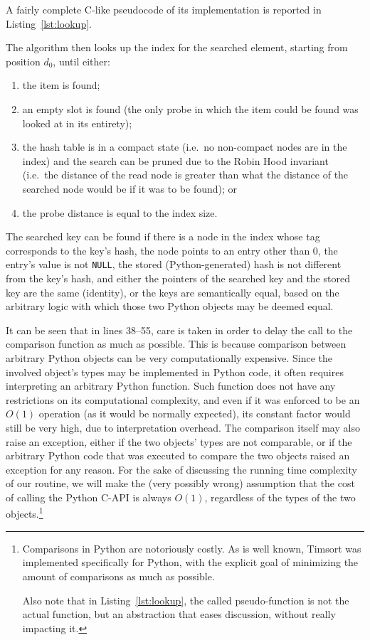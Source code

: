 A fairly complete C-like pseudocode of its implementation is reported in Listing~\ref{lst:lookup}.

The algorithm then looks up the index for the searched element, starting from position $d_0$, until either:
\begin{enumerate}
	\item the item is found;
	\item an empty slot is found (the only probe in which the item could be found was looked at in its entirety);
	\item the hash table is in a compact state (i.e.\ no non-compact nodes are in the index) and the search can be pruned due to the Robin Hood invariant (i.e.\ the distance of the read node is greater than what the distance of the searched node would be if it was to be found); or
	\item the probe distance is equal to the index size.
\end{enumerate}

The searched key can be found if there is a node in the index whose tag corresponds to the key's hash, the node points to an entry other than 0, the entry's value is not \texttt{NULL}, the stored (Python-generated) hash is not different from the key's hash, and either the pointers of the searched key and the stored key are the same (identity), or the keys are semantically equal, based on the arbitrary logic with which those two Python objects may be deemed equal.

It can be seen that in lines 38--55, care is taken in order to delay the call to the comparison function as much as possible.
This is because comparison between arbitrary Python objects can be very computationally expensive.
Since the involved object's types may be implemented in Python code, it often requires interpreting an arbitrary Python function.
Such function does not have any restrictions on its computational complexity, and even if it was enforced to be an $O(1)$ operation (as it would be normally expected), its constant factor would still be very high, due to interpretation overhead.
The comparison itself may also raise an exception, either if the two objects' types are not comparable, or if the arbitrary Python code that was executed to compare the two objects raised an exception for any reason.
For the sake of discussing the running time complexity of our routine, we will make the (very possibly wrong) assumption that the cost of calling the Python C-API is always $O(1)$, regardless of the types of the two objects.\footnote{%
	Comparisons in Python are notoriously costly.
	As is well known, Timsort was implemented specifically for Python, with the explicit goal of minimizing the amount of comparisons as much as possible.

	Also note that in Listing~\ref{lst:lookup}, the called pseudo-function is not the actual function, but an abstraction that eases discussion, without really impacting it.
}


